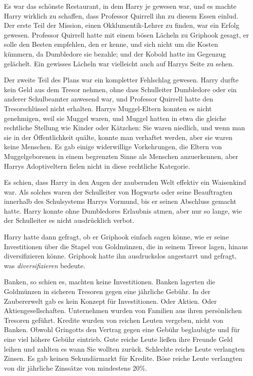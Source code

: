 Es war das schönste Restaurant, in dem Harry je gewesen war, und es machte Harry
wirklich zu schaffen, dass Professor Quirrell ihn zu diesem Essen einlud. Der
erste Teil der Mission, einen Okklumentik-Lehrer zu finden, war ein Erfolg
gewesen. Professor Quirrell hatte mit einem bösen Lächeln zu Griphook gesagt, er
solle den Besten empfehlen, den er kenne, und sich nicht um die Kosten kümmern,
da Dumbledore sie bezahle; und der Kobold hatte im Gegenzug gelächelt. Ein
gewisses Lächeln war vielleicht auch auf Harrys Seite zu sehen.

Der zweite Teil des Plans war ein kompletter Fehlschlag gewesen. Harry durfte
kein Geld aus dem Tresor nehmen, ohne dass Schulleiter Dumbledore oder ein
anderer Schulbeamter anwesend war, und Professor Quirrell hatte den
Tresorschlüssel nicht erhalten. Harrys Muggel-Eltern konnten es nicht
genehmigen, weil sie Muggel waren, und Muggel hatten in etwa die gleiche
rechtliche Stellung wie Kinder oder Kätzchen: Sie waren niedlich, und wenn man
sie in der Öffentlichkeit quälte, konnte man verhaftet werden, aber sie waren
keine Menschen. Es gab einige widerwillige Vorkehrungen, die Eltern von
Muggelgeborenen in einem begrenzten Sinne als Menschen anzuerkennen, aber Harrys
Adoptiveltern fielen nicht in diese rechtliche Kategorie.

Es schien, dass Harry in den Augen der zaubernden Welt effektiv ein Waisenkind
war. Als solches waren der Schulleiter von Hogwarts oder seine Beauftragten
innerhalb des Schulsystems Harrys Vormund, bis er seinen Abschluss gemacht
hatte. Harry konnte ohne Dumbledores Erlaubnis atmen, aber nur so lange, wie der
Schulleiter es nicht ausdrücklich verbot.

Harry hatte dann gefragt, ob er Griphook einfach sagen könne, wie er seine
Investitionen über die Stapel von Goldmünzen, die in seinem Tresor lagen, hinaus
diversifizieren könne. Griphook hatte ihn ausdruckslos angestarrt und gefragt,
was \glqq \emph{diversifizieren}\grqq{} bedeute.

Banken, so schien es, machten keine Investitionen. Banken lagerten die
Goldmünzen in sicheren Tresoren gegen eine jährliche Gebühr. In der Zaubererwelt
gab es kein Konzept für Investitionen. Oder Aktien. Oder Aktiengesellschaften.
Unternehmen wurden von Familien aus ihren persönlichen Tresoren geführt. Kredite
wurden von reichen Leuten vergeben, nicht von Banken. Obwohl Gringotts den
Vertrag gegen eine Gebühr beglaubigte und für eine viel höhere Gebühr eintrieb.
Gute reiche Leute ließen ihre Freunde Geld leihen und zahlten es wann Sie
wollten zurück. Schlechte reiche Leute verlangten Zinsen. Es gab keinen
Sekundärmarkt für Kredite. Böse reiche Leute verlangten von dir jährliche
Zinssätze von mindestens 20\%.

